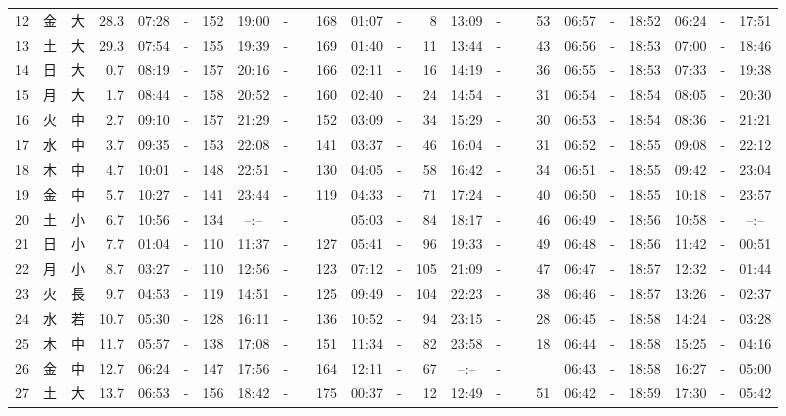 \documentclass[12pt,a4j]{jsarticle}
\begin{document}
\begin{table}[htbp]
\begin{center}
{\begin{tabular}{|rc|cr|ccrccr|ccrccr|ccc|ccc|}
12 & 金 & 大 & 28.3 &  07:28 &-& 152 &  19:00 &-& 168 &  01:07 &-&   8 &  13:09 &-&  53 & 06:57 & -& 18:52 & 06:24 & -& 17:51 \\
13 & 土 & 大 & 29.3 &  07:54 &-& 155 &  19:39 &-& 169 &  01:40 &-&  11 &  13:44 &-&  43 & 06:56 & -& 18:53 & 07:00 & -& 18:46 \\
14 & 日 & 大 &  0.7 &  08:19 &-& 157 &  20:16 &-& 166 &  02:11 &-&  16 &  14:19 &-&  36 & 06:55 & -& 18:53 & 07:33 & -& 19:38 \\
15 & 月 & 大 &  1.7 &  08:44 &-& 158 &  20:52 &-& 160 &  02:40 &-&  24 &  14:54 &-&  31 & 06:54 & -& 18:54 & 08:05 & -& 20:30 \\
16 & 火 & 中 &  2.7 &  09:10 &-& 157 &  21:29 &-& 152 &  03:09 &-&  34 &  15:29 &-&  30 & 06:53 & -& 18:54 & 08:36 & -& 21:21 \\
17 & 水 & 中 &  3.7 &  09:35 &-& 153 &  22:08 &-& 141 &  03:37 &-&  46 &  16:04 &-&  31 & 06:52 & -& 18:55 & 09:08 & -& 22:12 \\
18 & 木 & 中 &  4.7 &  10:01 &-& 148 &  22:51 &-& 130 &  04:05 &-&  58 &  16:42 &-&  34 & 06:51 & -& 18:55 & 09:42 & -& 23:04 \\
19 & 金 & 中 &  5.7 &  10:27 &-& 141 &  23:44 &-& 119 &  04:33 &-&  71 &  17:24 &-&  40 & 06:50 & -& 18:55 & 10:18 & -& 23:57 \\
20 & 土 & 小 &  6.7 &  10:56 &-& 134 &  --:-- &-&~~~~~ &  05:03 &-&  84 &  18:17 &-&  46 & 06:49 & -& 18:56 & 10:58 & -& --:-- \\
21 & 日 & 小 &  7.7 &  01:04 &-& 110 &  11:37 &-& 127 &  05:41 &-&  96 &  19:33 &-&  49 & 06:48 & -& 18:56 & 11:42 & -& 00:51 \\
22 & 月 & 小 &  8.7 &  03:27 &-& 110 &  12:56 &-& 123 &  07:12 &-& 105 &  21:09 &-&  47 & 06:47 & -& 18:57 & 12:32 & -& 01:44 \\
23 & 火 & 長 &  9.7 &  04:53 &-& 119 &  14:51 &-& 125 &  09:49 &-& 104 &  22:23 &-&  38 & 06:46 & -& 18:57 & 13:26 & -& 02:37 \\
24 & 水 & 若 & 10.7 &  05:30 &-& 128 &  16:11 &-& 136 &  10:52 &-&  94 &  23:15 &-&  28 & 06:45 & -& 18:58 & 14:24 & -& 03:28 \\
25 & 木 & 中 & 11.7 &  05:57 &-& 138 &  17:08 &-& 151 &  11:34 &-&  82 &  23:58 &-&  18 & 06:44 & -& 18:58 & 15:25 & -& 04:16 \\
26 & 金 & 中 & 12.7 &  06:24 &-& 147 &  17:56 &-& 164 &  12:11 &-&  67 &  --:-- &-&~~~~~ & 06:43 & -& 18:58 & 16:27 & -& 05:00 \\
27 & 土 & 大 & 13.7 &  06:53 &-& 156 &  18:42 &-& 175 &  00:37 &-&  12 &  12:49 &-&  51 & 06:42 & -& 18:59 & 17:30 & -& 05:42 \\

\end{tabular}}
\end{center}
\end{table}
\end{document}
